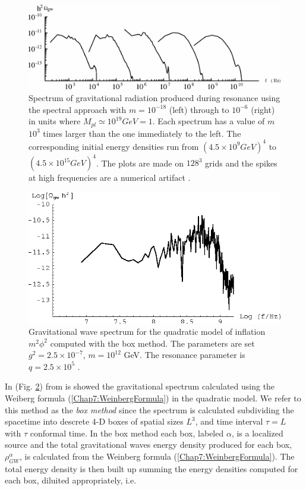\documentclass[11pt,a4paper,twoside]{book}
\begin{document}
\begin{figure}
	\centering
	\includegraphics[width=0.8\linewidth, height=0.3\textheight]{Images/Chap7/SpectralMethod_Fig1}
	\caption{Spectrum of gravitational radiation produced during resonance using the spectral approach with $m=10^{-18}$ (left) through to $ 10^{-6} $ (right) in units where $ M_{pl}\simeq 10^{19} GeV = 1 $. Each spectrum  has a value of $m$ $ 10^{3} $ times larger than the one immediately to the left. The corresponding initial energy densities run from $ (4.5 \times 10^{9} GeV)^{4} $ to $ (4.5 \times 10^{15} GeV)^{4} $. The plots are made on $ 128^{3} $ grids and the spikes at high frequencies are a numerical artifact \cite{Chap7:SpectralMethod}.}
	\label{fig:spectralmethodfig1}
\end{figure}
\begin{figure}
	\centering
	\includegraphics[width=0.6\linewidth, height=0.3\textheight]{Images/Chap7/BoxMethod_Fig4}
	\caption{Gravitational wave spectrum for the quadratic model of inflation $ m^{2}\phi^{2} $ computed with the box method. The parameters are set $ g^{2}=2.5\times 10^{-7} $, $ m=10^{12} $ GeV. The resonance parameter is $ q=2.5 \times 10^{5} $ \cite{Chap7:BoxMethod}.}
	\label{fig:boxmethodfig4}
\end{figure}
  In (Fig. \ref{fig:boxmethodfig4}) from \cite{Chap7:BoxMethod} is showed the gravitational spectrum calculated using the Weiberg formula (\ref{Chap7:WeinbergFormula}) in the quadratic model. We refer to this  method as the \textit{box method} since the spectrum is calculated subdividing the spacetime into descrete 4-D boxes of spatial sizes $ L^{3} $, and time interval $ \tau=L $ with $\tau$ conformal time. In the box method each box, labeled $\alpha$, is a localized source and the total gravitational waves energy density produced for each box, $\rho_{GW}^{\alpha}$, is calculated from the Weinberg formula (\ref{Chap7:WeinbergFormula}). The total energy density is then built up summing the energy densities computed for each box, diluited  appropriately, i.e.
\end{document}
